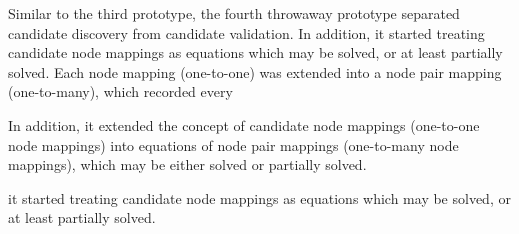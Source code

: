 Similar to the third prototype, the fourth throwaway prototype separated candidate discovery from candidate validation. In addition, it started treating candidate node mappings as equations which may be solved, or at least partially solved. Each node mapping (one-to-one) was extended into a node pair mapping (one-to-many), which recorded every

 In addition, it extended the concept of candidate node mappings (one-to-one node mappings) into equations of node pair mappings (one-to-many node mappings), which may be either solved or partially solved.

it started treating candidate node mappings as equations which may be solved, or at least partially solved.

%
%
%
%
%
%
%
%
%
%
%
